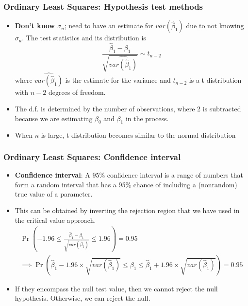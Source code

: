 \documentclass[aspectratio=169]{beamer}
\begin{document}
\begin{frame}
\frametitle{Ordinary Least Squares: Hypothesis test methods}

\begin{itemize}
\item \textbf{Don't know $\sigma_u$}; need to have an estimate for $var(\hat{\beta}_1)$ due to not knowing $\sigma_u$. The test statistics and its distribution is
\[
\frac{\hat{\beta}_1-\beta_1}{\sqrt{\widehat{var(\hat{\beta}_1)}}}\sim t_{n-2}
\]
where $\widehat{var(\hat{\beta}_1)}$ is the estimate for the variance and $t_{n-2}$ is a t-distribution with $n-2$ degrees of freedom.
\item The d.f. is determined by the number of observations, where 2 is subtracted because we are estimating $\beta_0$ and $\beta_1$ in the process.
\item When $n$ is large, t-distribution becomes similar to the normal distribution
\end{itemize}
\end{frame}

\begin{frame}
\frametitle{Ordinary Least Squares: Confidence interval}

\begin{itemize}
\item  \textbf{Confidence interval}: A 95\% confidence interval is a range of numbers that form a random interval that has a 95\% chance of including a (nonrandom) true value of a parameter. 
\item This can be obtained by inverting the rejection region that we have used in the critical value approach.
\footnotesize{\begin{gather*}
\Pr\left(-1.96\leq \frac{\hat{\beta}_1-\beta_1}{\sqrt{var(\hat{\beta}_1)}} \leq1.96\right)=0.95\\
\implies \Pr\left(\hat{\beta}_1-1.96\times\sqrt{var(\hat{\beta}_1)} \leq \beta_1 \leq\hat{\beta}_1+1.96\times\sqrt{var(\hat{\beta}_1)}\right)=0.95
\end{gather*}}\normalsize
\item  If they encompass the null test value, then we cannot reject the null hypothesis. Otherwise, we can reject the null. 
\end{itemize}
\end{frame}





\end{document}

